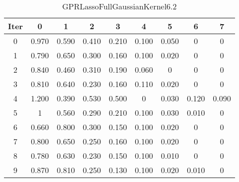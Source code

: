 \begin{table}
	\begin{center}
		\begin{tabular}{|c|c|c|c|c|c|c|c|c|}
			\hline
			Iter & 0 & 1 & 2 & 3 & 4 & 5 & 6 & 7 \\
			\hline
			0 & 0.970 & 0.590 & 0.410 & 0.210 & 0.100 & 0.050 & 0 & 0 \\
			\hline
			1 & 0.790 & 0.650 & 0.300 & 0.160 & 0.100 & 0.020 & 0 & 0 \\
			\hline
			2 & 0.840 & 0.460 & 0.310 & 0.190 & 0.060 & 0 & 0 & 0 \\
			\hline
			3 & 0.810 & 0.640 & 0.230 & 0.160 & 0.110 & 0.020 & 0 & 0 \\
			\hline
			4 & 1.200 & 0.390 & 0.530 & 0.500 & 0 & 0.030 & 0.120 & 0.090 \\
			\hline
			5 & 1 & 0.560 & 0.290 & 0.210 & 0.100 & 0.030 & 0.010 & 0 \\
			\hline
			6 & 0.660 & 0.800 & 0.300 & 0.150 & 0.100 & 0.020 & 0 & 0 \\
			\hline
			7 & 0.800 & 0.650 & 0.250 & 0.160 & 0.100 & 0.020 & 0 & 0 \\
			\hline
			8 & 0.780 & 0.630 & 0.230 & 0.150 & 0.100 & 0.010 & 0 & 0 \\
			\hline
			9 & 0.870 & 0.810 & 0.250 & 0.130 & 0.100 & 0.020 & 0.010 & 0 \\
			\hline
		\end{tabular}
	\end{center}
	\caption{GPRLassoFullGaussianKernel6.2}
\end{table}